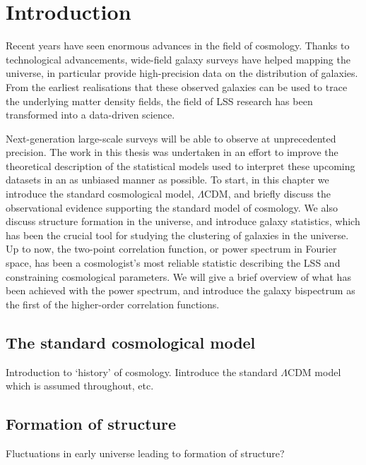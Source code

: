 
\chapter{Introduction}
\label{chapter:introgen}

Recent years have seen enormous advances in the field of cosmology. Thanks to technological advancements, wide-field galaxy surveys have helped mapping the universe, in particular provide high-precision data on the distribution of galaxies. From the earliest realisations that these observed galaxies can be used to trace the underlying matter density fields, the field of LSS research has been transformed into a data-driven science. 

Next-generation large-scale surveys will be able to observe at unprecedented precision. The work in this thesis was undertaken in an effort to improve the theoretical description of the statistical models used to interpret these upcoming datasets in an as unbiased manner as possible. To start, in this chapter we introduce the standard cosmological model, $\Lambda$CDM, and briefly discuss the observational evidence supporting the standard model of cosmology. We also discuss structure formation in the universe, and introduce galaxy statistics, which has been the crucial tool for studying the clustering of galaxies in the universe. Up to now, the two-point correlation function, or power spectrum in Fourier space, has been a cosmologist's most reliable statistic describing the LSS and constraining cosmological parameters. We will give a brief overview of what has been achieved with the power spectrum, and introduce the galaxy bispectrum as the first of the higher-order correlation functions. 

\section{The standard cosmological model}

Introduction to `history' of cosmology. Iintroduce the standard $\Lambda$CDM model which is assumed throughout, etc. 


\section{Formation of structure}

Fluctuations in early universe leading to formation of structure?


